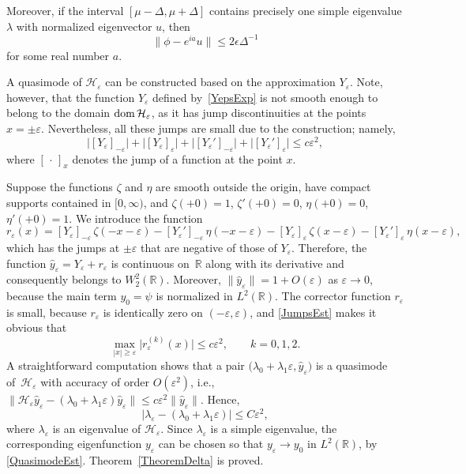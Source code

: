 \documentclass[reqno]{amsart}
\theoremstyle{definition}
\theoremstyle{remark}
\numberwithin{equation}{section}
\newcommand{\dmn}{\mathop{\rm dom}}
\newcommand{\Real}{\mathbb R}
\newcommand{\eps}{\varepsilon}
\newcommand{\cH}{\mathcal{H}}
\begin{document}
Moreover, if the interval $[\mu - \Delta, \mu + \Delta]$ contains precisely one simple eigenvalue $\lambda$ with normalized eigenvector $u$, then
\begin{equation}\label{QuasimodeEst}
  \|\phi - e^{ia} u\| \leq 2\epsilon\Delta^{-1}
\end{equation}
for some real number $a$.


A quasimode of $\cH_\eps$ can be constructed based on the approximation $Y_\eps$. Note, however, that the function $Y_\eps$ defined by~\eqref{YepsExp} is not smooth enough to belong to the domain $\dmn \cH_\eps$, as it has jump discontinuities at the points $x = \pm \eps$. Nevertheless, all these jumps are small due to the construction; namely,
\begin{equation}\label{JumpsEst}
  \big|[Y_\eps]_{-\eps}\big| + \big|[Y_\eps]_{\eps}\big| + \big|[Y_\eps']_{-\eps}\big| + \big|[Y_\eps']_{\eps}\big| \le c \eps^2,
\end{equation}
where $[\,\cdot\,]_x$ denotes the jump of a function at the point $x$.


	Suppose the functions $\zeta$ and $\eta$ are smooth outside the origin, have compact supports contained in $[0,\infty)$, and $\zeta(+0)=1$, $\zeta'(+0)=0$, $\eta(+0)=0$, $\eta'(+0)=1$. We introduce the function
	\begin{equation*}
		r_\eps(x)=[Y_\eps]_{-\eps}\, \zeta(-x-\eps)-[Y_\eps']_{-\eps}\,\eta(-x-\eps)-[Y_\eps]_{\eps}\,\zeta(x-\eps)-[Y_\eps']_{\eps}\,\eta(x-\eps),
	\end{equation*}
	which has the jumps at $\pm\eps$ that are negative of those of $Y_\eps$. Therefore, the function $\hat{y}_\eps=Y_\eps+r_\eps$
	is continuous on~$\Real$ along with its derivative and consequently belongs to $W_2^2(\Real)$. Moreover, $\|\hat{y}_\eps\|=1+O(\eps)$ as $\eps\to 0$, because the main term $y_0=\psi$ is normalized in $L^2(\Real)$. The corrector function $r_\eps$ is small, because $r_\eps$ is identically zero on $(-\eps,\eps)$, and \eqref{JumpsEst} makes it obvious that
	\begin{equation*}
		\max_{|x|\ge \eps}\big|r_{\eps}^{(k)}(x)\big|\le c\eps^2,\qquad k=0,1,2.
	\end{equation*}
	A straightforward computation shows that a pair $\big(\lambda_0+\lambda_1\eps,\hat{y}_\eps\big)$ is a quasimode of~$\cH_\eps$ with accuracy of order $O(\eps^2)$, i.e., $\|\cH_\eps\hat{y}_\eps-(\lambda_0+\lambda_1\eps)\hat{y}_\eps \|\le c\eps^2\|\hat{y}_\eps\|$. Hence,
	\begin{equation*}
		|\lambda_\eps-(\lambda_0+\lambda_1\eps)|\le C\eps^2,
	\end{equation*}
	where $\lambda_\eps$ is an eigenvalue of $\cH_\eps$. Since $\lambda_\eps$ is a simple eigenvalue, the corresponding eigenfunction $y_\eps$ can be chosen so that $y_\eps\to y_0$ in $L^2(\Real)$, by \eqref{QuasimodeEst}.
Theorem~\ref{TheoremDelta} is proved.
\end{document}
